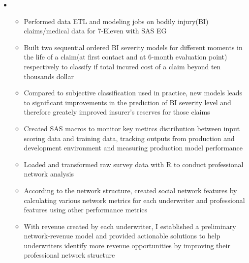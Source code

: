 \documentclass[11pt,a4paper,sans]{moderncv}        %
\begin{document}
\begin{itemize}
	\item{
		{\vspace{3pt}
			\begin{itemize}
				\item Performed data ETL and modeling jobs on bodily injury(BI) claims/medical data for 7-Eleven with SAS EG
				\item Built two sequential ordered BI severity models for different moments in the life of a claim(at first contact and at 6-month evaluation point) respectively to classify if total incured cost of a claim beyond ten thousands dollar 
				\item Compared to subjective classification used in practice, new models leads to significant improvements in the prediction of BI severity level and therefore greately improved insurer's reserves for those claims
				\item Created SAS macros to monitor key metircs distribution between input scoring data and training data, tracking outputs from production and development environment and measuring production model performance 
				\item  Loaded and transformed raw survey data with R to conduct professional network analysis 
				\item According to the network structure, created social network features by calculating various network metrics for each underwriter and professional features using other performance metrics
				\item With revenue created by each underwriter, I established a preliminary network-revenue model and provided actionable solutions to help underwriters identify more revenue opportunities by improving their professional network structure 
		    \end{itemize}}}


\end{itemize}
\end{document}
